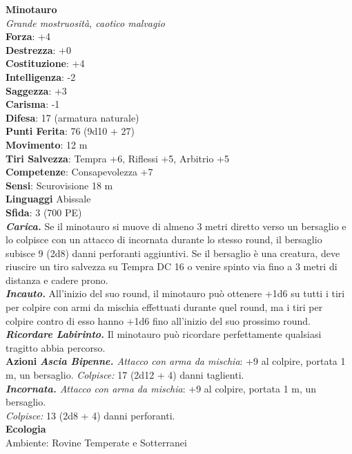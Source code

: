 \begin{multicols}{2}
\medskip\textbf{Minotauro}\\
\emph{Grande mostruosità, caotico malvagio}\\
\textbf{Forza}: +4\\
\textbf{Destrezza}: +0\\
\textbf{Costituzione}: +4\\
\textbf{Intelligenza}: -2\\
\textbf{Saggezza}: +3\\
\textbf{Carisma}: -1\\
\textbf{Difesa}: 17 (armatura naturale)\\
\textbf{Punti Ferita}: 76 (9d10 + 27)\\
\textbf{Movimento}: 12 m\\
\textbf{Tiri Salvezza}: Tempra +6, Riflessi +5, Arbitrio +5\\
\textbf{Competenze}: Consapevolezza +7\\
\textbf{Sensi}: Scurovisione 18 m\\
\textbf{Linguaggi} Abissale\\
\textbf{Sfida}: 3 (700 PE)\smallskip\\
\emph{\textbf{Carica.}} Se il minotauro si muove di almeno 3 metri diretto verso un bersaglio e lo colpisce con un attacco di incornata durante lo stesso round, il bersaglio subisce 9 (2d8) danni perforanti aggiuntivi. Se il bersaglio è una creatura, deve riuscire un tiro salvezza su Tempra DC  16 o venire spinto via fino a 3 metri di distanza e cadere prono.\\
\emph{\textbf{Incauto.}} All'inizio del suo round, il minotauro può ottenere +1d6 su tutti i tiri per colpire con armi da mischia effettuati durante quel round, ma i tiri per colpire contro di esso hanno +1d6 fino all'inizio del suo prossimo round.\\
\emph{\textbf{Ricordare Labirinto.}} Il minotauro può ricordare perfettamente qualsiasi tragitto abbia percorso.\\
\smallskip\textbf{Azioni}  
\emph{\textbf{Ascia Bipenne.} Attacco con arma da mischia}: +9 al colpire, portata 1 m, un bersaglio.
\emph{Colpisce:} 17 (2d12 + 4) danni taglienti.\\
\emph{\textbf{Incornata.} Attacco con arma da mischia}: +9 al colpire, portata 1 m, un bersaglio.\\
\emph{Colpisce:} 13 (2d8 + 4) danni perforanti.\\
\textbf{Ecologia}\\
Ambiente: Rovine Temperate e Sotterranei\\

\end{multicols}
